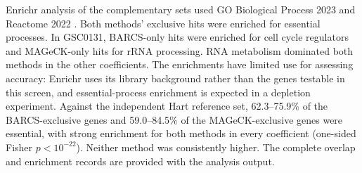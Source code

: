 Enrichr analysis of the complementary sets used GO Biological Process 2023 and
Reactome 2022 \citep{chen2013enrichr}.  Both methods' exclusive hits were
enriched for essential processes.  In GSC0131, BARCS-only hits were enriched
for cell cycle regulators and MAGeCK-only hits for rRNA processing.  RNA
metabolism dominated both methods in the other coefficients.  The enrichments
have limited use for assessing accuracy: Enrichr uses its library background
rather than the genes testable in this screen, and essential-process
enrichment is expected in a depletion experiment.  Against the independent
Hart reference set, 62.3--75.9\% of the BARCS-exclusive genes and 59.0--84.5\%
of the MAGeCK-exclusive genes were essential, with strong enrichment for both
methods in every coefficient (one-sided Fisher $p<10^{-22}$).  Neither method
was consistently higher.  The complete overlap and enrichment records are
provided with the analysis output.
